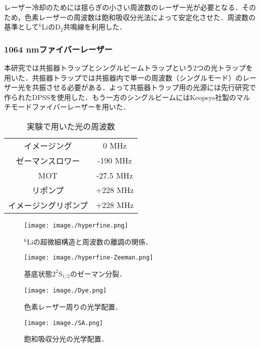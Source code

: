 \documentclass[11pt,a4j,notitlepage]{jreport}
\begin{document}
レーザー冷却のためには揺らぎの小さい周波数のレーザー光が必要となる．そのため，色素レーザーの周波数は飽和吸収分光法によって安定化させた\cite{YoshiJun}\cite{Miyato}．周波数の基準として$^6$LiのD$_2$共鳴線を利用した．

\subsubsection{1064 nmファイバーレーザー}
本研究では共振器トラップとシングルビームトラップという$2$つの光トラップを用いた．共振器トラップでは共振器内で単一の周波数（シングルモード）のレーザー光を共振させる必要がある．よって共振器トラップ用の光源には先行研究で作られたDPSSを使用した\cite{Miyake}．もう一方のシングルビームにはKeopsys社製のマルチモードファイバーレーザーを用いた．

\clearpage
\begin{table}[h]
\centering
	\caption{実験で用いた光の周波数}
		\begin{tabular}{cc}
		\hline
		イメージング & 0 MHz \\
		ゼーマンスロワー & -190 MHz \\
		MOT & -27.5 MHz \\
		リポンプ & +228 MHz \\
		イメージングリポンプ & +228 MHz \\ \hline
		\end{tabular}
	\label{tab3.3.1}
\end{table}
\begin{figure}[h]
	\centering
		\texttt{[image: image./hyperfine.png]}
	\caption{$^6$Liの超微細構造と周波数の離調の関係．}
	\label{fig3.3.1}
\end{figure}
\begin{figure}[h]
	\centering
		\texttt{[image: image./hyperfine-Zeeman.png]}
	\caption{基底状態$2^2$S$_{1/2}$のゼーマン分裂．}
	\label{fig3.3.1.5}
\end{figure}

\clearpage
\begin{figure}[h]
	\centering
		\texttt{[image: image./Dye.png]}
	\caption{色素レーザー周りの光学配置．}
	\label{fig3.3.2}
\end{figure}
\clearpage

\begin{figure}[h]
	\centering
		\texttt{[image: image./SA.png]}
	\caption{飽和吸収分光の光学配置．}
	\label{fig3.3.3}
\end{figure}
\end{document}

